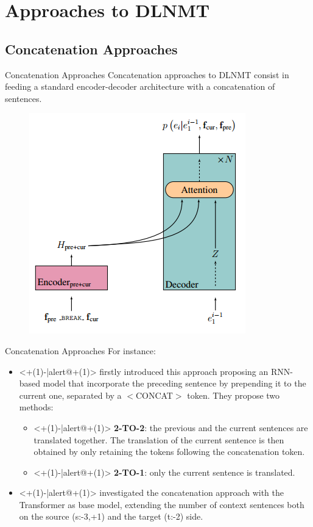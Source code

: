 \section{Approaches to DLNMT}

\subsection{Concatenation Approaches}

\begin{frame}{Concatenation Approaches}
Concatenation approaches to DLNMT consist in feeding a standard encoder-decoder architecture with a concatenation of sentences. 
	\begin{figure}
		\centering
		\includegraphics[width=0.45\linewidth]{Images/concatenation}
		\label{fig:concatenation}
	\end{figure}
\end{frame}

\begin{frame}{Concatenation Approaches}
For instance:
	\begin{itemize}
		\item<+(1)-|alert@+(1)> \cite{tiedemann_neural_2017} firstly introduced this approach proposing an RNN-based model that incorporate the preceding sentence by prepending it to the current one, separated by a $<$CONCAT$>$ token. They propose two methods:
			\begin{itemize}
				\item<+(1)-|alert@+(1)> \textbf{2-TO-2}: the previous and the current sentences are translated together. The translation of the current sentence is then obtained by only retaining the tokens following the concatenation token.
				\item<+(1)-|alert@+(1)> \textbf{2-TO-1}: only the current sentence is translated. 
			\end{itemize}
		\item<+(1)-|alert@+(1)> \cite{agrawal_contextual_2018,scherrer_analysing_2019} investigated the concatenation approach with the Transformer as base model, extending the number of context sentences both on the source (s:-3,+1) and the target (t:-2) side.
	\end{itemize}
\end{frame}


